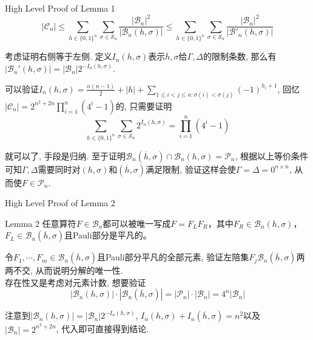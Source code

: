 \documentclass{beamer}
\begin{document}
\begin{frame}{High Level Proof of Lemma 1}
	$$|\mathcal C_n| \le \sum_{h \in \{0, 1\}^n} \sum_{\sigma \in \mathcal S_n} \frac{|\mathcal B_n|^2}{|\mathcal B_n(h, \sigma)|} \le \sum_{h \in \{0, 1\}^n} \sum_{\sigma \in \mathcal S_n} \frac{|\mathcal B_n|^2}{|\mathcal B'_n(h, \sigma)|}$$\pause
	
	考虑证明右侧等于左侧. 定义$I_n(h, \sigma)$表示$\overline h, \sigma$给$\Gamma, \Delta$的限制条数, 那么有$|\mathcal B_n'(h, \sigma)| = |\mathcal B_n|2^{-I_n(h, \sigma)}$.
	
	可以验证$I_n(h, \sigma) = \frac{n(n-1)}{2} + |h| + \sum_{1 \le i < j \le n: \sigma(i) < \sigma(j)}(-1)^{h_i + 1}$, 回忆$|\mathcal C_n|= 2^{n^2 + 2n}\prod_{i=1}^{n}(4^i-1)$的, 只需要证明$$\sum_{h \in \{0, 1\}^n} \sum_{\sigma \in \mathcal S_n} 2^{I_n(h, \sigma)} = \prod_{i=1}^{n}(4^i-1)$$
	
	就可以了, 手段是归纳. \pause 至于证明$\mathcal B_n(\overline{h}, \sigma) \cap \mathcal B_n(h, \sigma) = \mathcal P_n$, 根据以上等价条件可知$\Gamma, \Delta$需要同时对$(h, \sigma)$和$(\overline h, \sigma)$满足限制, 验证这样会使$\Gamma = \Delta = 0^{n\times n}$, 从而使$F \in \mathcal P_n$.
\end{frame}
\begin{frame}{High Level Proof of Lemma 2}
\begin{block}{Lemma 2}
	任意算符$F \in \mathcal B_n$都可以被唯一写成$F = F_LF_R$，其中$F_R \in \mathcal B_n(h, \sigma)$，$F_L \in \mathcal B_n(\overline{h}, \sigma)$且Pauli部分是平凡的。
\end{block}\pause
令$F_1, \cdots, F_m \in \mathcal B_n(\overline{h}, \sigma)$且Pauli部分平凡的全部元素, 验证左陪集$F_j\mathcal B_n(\overline{h}, \sigma)$两两不交, 从而说明分解的唯一性.\pause\\

存在性又是考虑对元素计数, 想要验证
$$|\mathcal B_n(h, \sigma)| \cdot |\mathcal B_n(\overline h, \sigma)| = |\mathcal P_n| \cdot |\mathcal B_n| = 4^n |\mathcal B_n|$$

注意到$|\mathcal B_n(h, \sigma)| = |\mathcal B_n|2^{-I_n(h, \sigma)}$, $I_n(h, \sigma) + I_n(\overline h, \sigma) = n^2$以及$|\mathcal B_n| = 2^{n^2+2n}$, 代入即可直接得到结论.
\end{frame}
\end{document}
